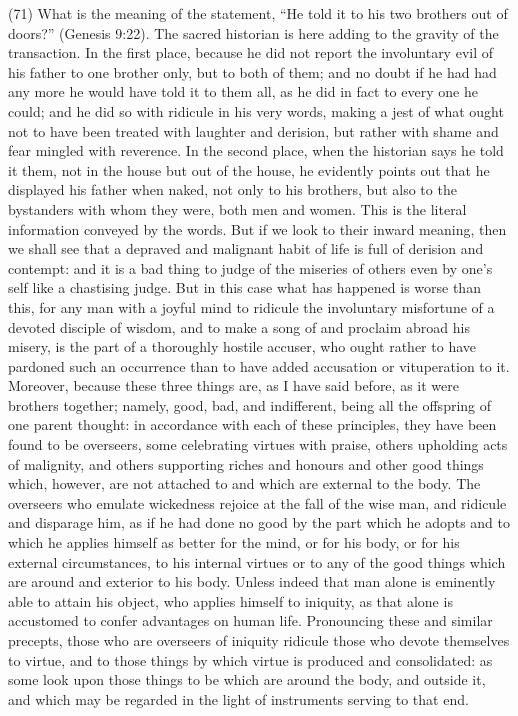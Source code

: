 (71) What is the meaning of the statement, ``He told it to his two brothers out of doors?'' (Genesis
9:22). The sacred historian is here adding to the gravity of the transaction. In the first place,
because he did not report the involuntary evil of his father to one brother only, but to both of them;
and no doubt if he had had any more he would have told it to them all, as he did in fact to every one
he could; and he did so with ridicule in his very words, making a jest of what ought not to have been
treated with laughter and derision, but rather with shame and fear mingled with reverence. In the
second place, when the historian says he told it them, not in the house but out of the house, he
evidently points out that he displayed his father when naked, not only to his brothers, but also to the
bystanders with whom they were, both men and women. This is the literal information conveyed by
the words. But if we look to their inward meaning, then we shall see that a depraved and malignant
habit of life is full of derision and contempt: and it is a bad thing to judge of the miseries of others
even by one's self like a chastising judge. But in this case what has happened is worse than this,
for any man with a joyful mind to ridicule the involuntary misfortune of a devoted disciple of wisdom,
and to make a song of and proclaim abroad his misery, is the part of a thoroughly hostile accuser,
who ought rather to have pardoned such an occurrence than to have added accusation or
vituperation to it. Moreover, because these three things are, as I have said before, as it were
brothers together; namely, good, bad, and indifferent, being all the offspring of one parent thought:
in accordance with each of these principles, they have been found to be overseers, some
celebrating virtues with praise, others upholding acts of malignity, and others supporting riches and
honours and other good things which, however, are not attached to and which are external to the
body. The overseers who emulate wickedness rejoice at the fall of the wise man, and ridicule and
disparage him, as if he had done no good by the part which he adopts and to which he applies
himself as better for the mind, or for his body, or for his external circumstances, to his internal
virtues or to any of the good things which are around and exterior to his body. Unless indeed that
man alone is eminently able to attain his object, who applies himself to iniquity, as that alone is
accustomed to confer advantages on human life. Pronouncing these and similar precepts, those
who are overseers of iniquity ridicule those who devote themselves to virtue, and to those things by
which virtue is produced and consolidated: as some look upon those things to be which are around
the body, and outside it, and which may be regarded in the light of instruments serving to that end.


